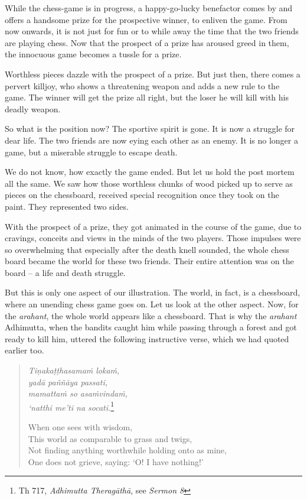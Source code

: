 While the chess-game is in progress, a happy-go-lucky benefactor comes by and offers a handsome prize for the prospective winner, to enliven the game. From now onwards, it is not just for fun or to while away the time that the two friends are playing chess. Now that the prospect of a prize has aroused greed in them, the innocuous game becomes a tussle for a prize.

Worthless pieces dazzle with the prospect of a prize. But just then, there comes a pervert killjoy, who shows a threatening weapon and adds a new rule to the game. The winner will get the prize all right, but the loser he will kill with his deadly weapon.

So what is the position now? The sportive spirit is gone. It is now a struggle for dear life. The two friends are now eying each other as an enemy. It is no longer a game, but a miserable struggle to escape death.

We do not know, how exactly the game ended. But let us hold the post mortem all the same. We saw how those worthless chunks of wood picked up to serve as pieces on the chessboard, received special recognition once they took on the paint. They represented two sides.

With the prospect of a prize, they got animated in the course of the game, due to cravings, conceits and views in the minds of the two players. Those impulses were so overwhelming that especially after the death knell sounded, the whole chess board became the world for these two friends. Their entire attention was on the board -- a life and death struggle.

But this is only one aspect of our illustration. The world, in fact, is a chessboard, where an unending chess game goes on. Let us look at the other aspect. Now, for the \emph{arahant}, the whole world appears like a chessboard. That is why the \emph{arahant} Adhimutta, when the bandits caught him while passing through a forest and got ready to kill him, uttered the following instructive verse, which we had quoted earlier too.

\begin{quote}
\emph{Tiṇakaṭṭhasamaṁ lokaṁ,}\\
\emph{yadā paññāya passati,}\\
\emph{mamattaṁ so asaṁvindaṁ,}\\
\emph{`natthi me'ti na socati.}\footnote{Th 717, \emph{Adhimutta Theragāthā}, see \emph{Sermon 8}}

When one sees with wisdom,\\
This world as comparable to grass and twigs,\\
Not finding anything worthwhile holding onto as mine,\\
One does not grieve, saying: `O! I have nothing!'
\end{quote}

